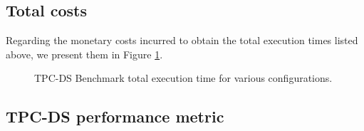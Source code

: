 \subsection{Total costs}\label{resultsSummaryTotalCost}

Regarding the monetary costs incurred to obtain the total execution times listed above, we present them in Figure \ref{fig:resultsSummaryTotalCosts}.

\begin{figure}
   \begin{center}
   \end{center}
   \caption{TPC-DS Benchmark total execution time for various configurations.}
   \label{fig:resultsSummaryTotalCosts}
\end{figure}

\subsection{TPC-DS performance metric}\label{resultsSummaryPerformanceMetric}
